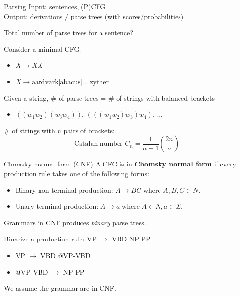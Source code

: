 \documentclass[usenames,dvipsnames,notes,11pt,aspectratio=169]{beamer}
\begin{document}
\begin{frame}
    {Parsing}
    Input: sentences, (P)CFG \\
    Output: derivations / parse trees (with scores/probabilities)

    Total number of parse trees for a sentence?

    Consider a minimal CFG:\\
    \begin{itemize}
        \item[] $X\rightarrow XX$
        \item[] $X\rightarrow \text{aardvark} | \text{abacus} | \ldots | \text{zyther}$
    \end{itemize}

    Given a string, \# of parse trees = \# of strings with balanced brackets\\
    \begin{itemize}
        \item[] $((w_1 w_2) (w_3 w_4))$, $(((w_1 w_2) w_3) w_4)$, ...
    \end{itemize}

    \# of strings with $n$ pairs of brackets:
    $$
    \text{Catalan number } C_n = \frac{1}{n+1}{2n\choose n}
    $$
\end{frame}

\begin{frame}
    {Chomsky normal form (CNF)}
    A CFG is in \textbf{Chomsky normal form} if every production rule takes one of the following forms:
    \begin{itemize}
        \item Binary non-terminal production: $A\rightarrow BC$ where $A, B, C\in N$.
        \item Unary terminal production: $A\rightarrow a$ where $A\in N, a\in\Sigma$.
    \end{itemize}

    Grammars in CNF produces \emph{binary} parse trees.

    Binarize a production rule: VP $\rightarrow$ VBD NP PP\\
    \begin{itemize}
        \item[] VP $\rightarrow$ VBD @VP-VBD
        \item[] @VP-VBD $\rightarrow$ NP PP
    \end{itemize}

    We assume the grammar are in CNF.
\end{frame}
\end{document}
